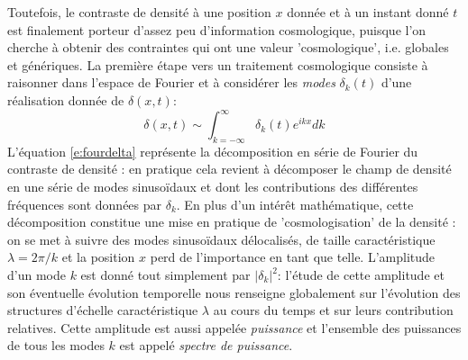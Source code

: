 Toutefois, le contraste de densité à une position $x$ donnée et à un instant donné $t$ est finalement porteur d'assez peu d'information cosmologique, puisque l'on cherche à obtenir des contraintes qui ont une valeur 'cosmologique', i.e. globales et génériques. La première étape vers un traitement cosmologique consiste à raisonner dans l'espace de Fourier et à considérer les \textit{modes} $\delta_k(t)$ d'une réalisation donnée de $\delta(x,t)$:
\begin{equation}
\delta(x,t)\sim\int_{k=-\infty}^\infty \delta_k(t) e^{ikx} dk
\label{e:fourdelta}
\end{equation}
L'équation \ref{e:fourdelta} représente la décomposition en série de Fourier du contraste de densité : en pratique cela revient à décomposer le champ de densité en une série de modes sinusoïdaux et dont les contributions des différentes fréquences sont données par $\delta_k$. En plus d'un intérêt mathématique, cette décomposition constitue une mise en pratique de 'cosmologisation' de la densité : on se met à suivre des modes sinusoïdaux délocalisés, de taille caractéristique $\lambda=2\pi/k$ et la position $x$ perd de l'importance en tant que telle. L'amplitude d'un mode $k$ est donné tout simplement par $|\delta_k|^2$: l'étude de cette amplitude et son éventuelle évolution temporelle nous renseigne globalement sur l'évolution des structures d'échelle caractéristique $\lambda$ au cours du temps et sur leurs contribution relatives. Cette amplitude est aussi appelée \textit{puissance} et l'ensemble des puissances de tous les modes $k$ est appelé \textit{spectre de puissance}.

